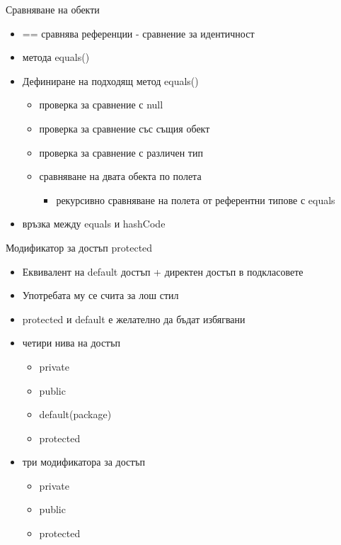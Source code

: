 \documentclass{beamer}
\begin{document}
\begin{frame}{Сравняване на обекти}
  \transdissolve
  \begin{itemize}
  \item == сравнява референции - сравнение за идентичност
  \item метода equals()
  \item Дефиниране на подходящ метод equals()
    \begin{itemize}
      \item проверка за сравнение с null
      \item проверка за сравнение със същия обект
      \item проверка за сравнение с различен тип
      \item сравняване на двата обекта по полета
      \begin{itemize}
        \item рекурсивно сравняване на полета от референтни типове с equals
      \end{itemize}

    \end{itemize}

  \item връзка между equals и hashCode
  \end{itemize}
\end{frame}

\begin{frame}{Модификатор за достъп protected}
  \transdissolve
  \begin{itemize}
  \item Еквивалент на default достъп + директен достъп в подкласовете
  \item Употребата му се счита за лош стил
  \item protected и default е желателно да бъдат избягвани
  \item четири нива на достъп
    \begin{itemize}
      \item private
      \item public
      \item default(package)
      \item protected
    \end{itemize}
  \item три модификатора за достъп
    \begin{itemize}
      \item private
      \item public
      \item protected
    \end{itemize}

  \end{itemize}
\end{frame}
\end{document}
